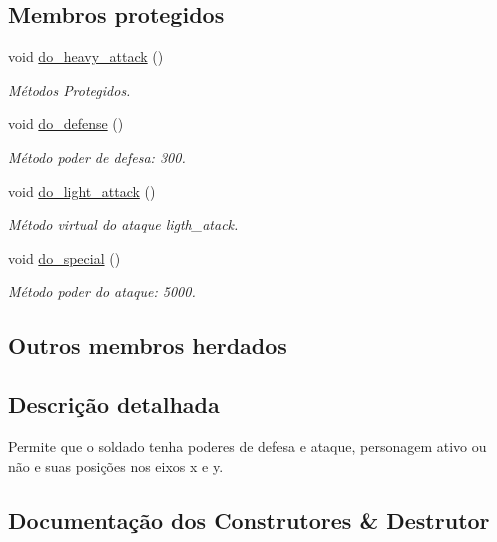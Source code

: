 \subsection*{Membros protegidos}
\begin{DoxyCompactItemize}
\item 
void \mbox{\hyperlink{classSoldier_af06682afbd0dd5f560e31228688b21fe}{do\+\_\+heavy\+\_\+attack}} ()
\begin{DoxyCompactList}\small\item\em Métodos Protegidos. \end{DoxyCompactList}\item 
void \mbox{\hyperlink{classSoldier_a4c6ff38e85e61c7112526d29059480fb}{do\+\_\+defense}} ()
\begin{DoxyCompactList}\small\item\em Método poder de defesa\+: 300. \end{DoxyCompactList}\item 
void \mbox{\hyperlink{classSoldier_ab0941d83546b933924b17b9aaa92818c}{do\+\_\+light\+\_\+attack}} ()
\begin{DoxyCompactList}\small\item\em Método virtual do ataque ligth\+\_\+atack. \end{DoxyCompactList}\item 
void \mbox{\hyperlink{classSoldier_a3e5574a74b969d5b26cf3ad0f3f7f085}{do\+\_\+special}} ()
\begin{DoxyCompactList}\small\item\em Método poder do ataque\+: 5000. \end{DoxyCompactList}\end{DoxyCompactItemize}
\subsection*{Outros membros herdados}


\subsection{Descrição detalhada}
Permite que o soldado tenha poderes de defesa e ataque, personagem ativo ou não e suas posições nos eixos x e y. 

\subsection{Documentação dos Construtores \& Destrutor}
\mbox{\label{classSoldier_ac0fd0515763f51a11b2785e5cac088e6}} 
